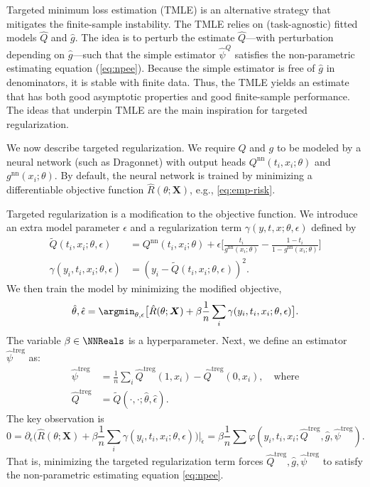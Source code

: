 \documentclass{article}
\begin{document}
Targeted minimum loss estimation (TMLE) \cite{vanderLaan:Rose:2011}
is an alternative strategy that mitigates the finite-sample instability.
The TMLE relies on (task-agnostic) fitted models $\hat{Q}$ and $\hat{g}$.
The idea is to perturb the estimate $\hat{Q}$---with perturbation depending on $\hat{g}$---such that
the simple estimator $\hat{\psi}^Q$ satisfies the non-parametric estimating equation (\cref{eq:npee}).
Because the simple estimator is free of $\hat{g}$ in denominators, it is stable with finite data.
Thus, the TMLE yields an estimate that has both
good asymptotic properties and good finite-sample performance.
The ideas that underpin TMLE are the main inspiration for targeted regularization. 

 We now describe targeted regularization.
We require $Q$ and $g$ to be modeled by a neural network (such as Dragonnet)
with output heads $Q^{\mathrm{nn}}(t_{i},x_{i};\theta)$ and $g^{\mathrm{nn}}(x_{i};\theta)$.
By default, the neural network is trained by minimizing a differentiable objective function $\hat{R}(\theta;\boldsymbol{X})$, e.g., \cref{eq:emp-risk}.

Targeted regularization is a modification to the objective function.
We introduce an extra model parameter $\epsilon$ and a regularization term $\gamma(y,t,x;\theta,\epsilon)$
defined by
\begin{align*}
  \tilde{Q}(t_{i},x_{i};\theta,\epsilon) &
        = Q^{\mathrm{nn}}(t_i,x_i;\theta)+\epsilon \Big[\frac{t_i}{g^{\mathrm{nn}}(x_i;\theta)}-\frac{1-t_i}{1-g^{\mathrm{nn}}(x_i;\theta)} \Big]\\
\gamma(y_i,t_i,x_i;\theta,\epsilon) & =(y_i-\tilde{Q}(t_{i},x_{i};\theta,\epsilon))^{2}.
\end{align*}
We then train the model by minimizing the modified objective,
\begin{equation}
  \label{tarregobjective}
  \hat{\theta},\hat{\epsilon}=\argmin_{\theta,\epsilon} \big[\hat{R}(\theta;\boldsymbol{X})+
  \beta\frac{1}{n}\sum_{i}\gamma(y_{i},t_{i},x_{i};\theta,\epsilon) \big].
\end{equation}
The variable $\beta\in\NNReals$ is a hyperparameter.
Next, we define an estimator $\hat{\psi}^{\mathrm{treg}}$ as:
\begin{align}
  \hat{\psi}^{\mathrm{treg}} &=\frac{1}{n}\sum_{i}\hat{Q}^{\mathrm{treg}}(1,x_{i})-\hat{Q}^{\mathrm{treg}}(0,x_{i}), \quad \text{where}\\   \label{eq:psitreg}
  \hat{Q}^{\mathrm{treg}} &=\tilde{Q}(\cdot,\cdot;\hat{\theta},\hat{\epsilon}).
\end{align}
The key observation is 
\begin{equation}
0=\partial_{\epsilon} \big (\hat{R}(\theta;\boldsymbol{X})+ \beta \frac{1}{n}\sum_{i}\gamma(y_{i},t_{i},x_{i};\theta,\epsilon) \big)\big\lvert_{\hat{\epsilon}}=\beta  \frac{1}{n}\sum\varphi(y_{i},t_{i},x_{i};\hat{Q}^{\mathrm{treg}},\hat{g},\hat{\psi}^{\mathrm{treg}}).\label{eq:tmletrick}
\end{equation}
That is, minimizing the targeted regularization term forces 
$\hat{Q}^{\mathrm{treg}},\hat{g},\hat{\psi}^{\mathrm{treg}}$
to satisfy the non-parametric estimating equation \cref{eq:npee}.
\end{document}
